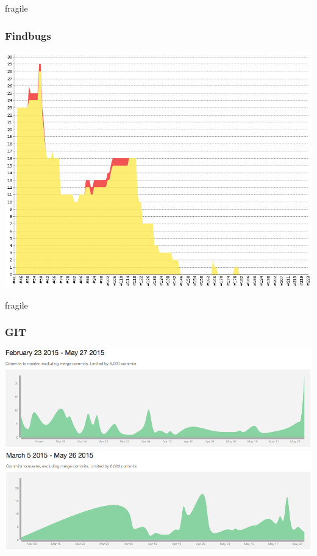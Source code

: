 \documentclass[10pt, compress]{beamer}
\begin{document}
\begin{frame}{fragile}
   \frametitle{Findbugs}
\includegraphics[scale=0.35]{findbugs}
\end{frame}

\begin{frame}{fragile}
   \frametitle{GIT}
   \includegraphics[scale=0.3]{doku}\newline
\includegraphics[scale=0.3]{code}
\end{frame}
\end{document}
